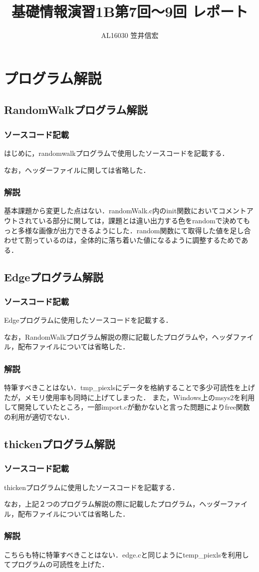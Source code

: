 \documentclass[a4j,12pt]{jreport}
\title{基礎情報演習1B第7回～9回 レポート}
\author{AL16030 笠井信宏}
\begin{document}
\maketitle
\chapter{プログラム解説}
\section{RandomWalkプログラム解説}
\subsection{ソースコード記載}
はじめに，randomwalkプログラムで使用したソースコードを記載する．




なお，ヘッダーファイルに関しては省略した．
\subsection{解説}
基本課題から変更した点はない．randomWalk.c内のinit関数においてコメントアウトされている部分に関しては，課題とは違い出力する色をrandomで決めてもっと多様な画像が出力できるようにした．random関数にて取得した値を足し合わせて割っているのは，全体的に落ち着いた値になるように調整するためである．
\section{Edgeプログラム解説}
\subsection{ソースコード記載}
Edgeプログラムに使用したソースコードを記載する．

なお，RandomWalkプログラム解説の際に記載したプログラムや，ヘッダファイル，配布ファイルについては省略した．
\subsection{解説}
特筆すべきことはない．tmp\_piexlsにデータを格納することで多少可読性を上げたが，メモリ使用率も同時に上げてしまった．
また，Windows上のmsys2を利用して開発していたところ，一部import.cが動かないと言った問題によりfree関数の利用が適切でない．
\section{thickenプログラム解説}
\subsection{ソースコード記載}
thickenプログラムに使用したソースコードを記載する．

なお，上記２つのプログラム解説の際に記載したプログラム，ヘッダーファイル，配布ファイルについては省略した．
\subsection{解説}
こちらも特に特筆すべきことはない．edge.cと同じようにtemp\_piexlsを利用してプログラムの可読性を上げた．
\end{document}

